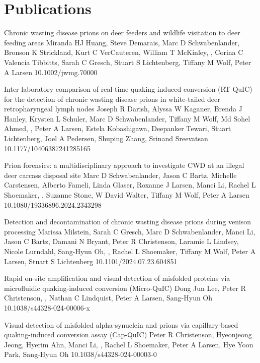 \documentclass{resume}
\begin{document}
    \section{Publications}
        \begin{samepage}
            {Chronic wasting disease prions on deer feeders and wildlife visitation to deer feeding areas}
            {Miranda HJ Huang, Steve Demarais, Marc D Schwabenlander, Bronson K Strickland, Kurt C VerCauteren, William T McKinley, \me{}, Corina C Valencia Tibbitts, Sarah C Gresch, Stuart S Lichtenberg, Tiffany M Wolf, Peter A Larsen}
            {10.1002/jwmg.70000}

            {Inter-laboratory comparison of real-time quaking-induced conversion (RT-QuIC) for the detection of chronic wasting disease prions in white-tailed deer retropharyngeal lymph nodes}
            {Joseph R Darish, Alyssa W Kaganer, Brenda J Hanley, Krysten L Schuler, Marc D Schwabenlander, Tiffany M Wolf, Md Sohel Ahmed, \me{}, Peter A Larsen, Estela Kobashigawa, Deepanker Tewari, Stuart Lichtenberg, Joel A Pedersen, Shuping Zhang, Srinand Sreevatsan}
            {10.1177/10406387241285165}

            {Prion forensics: a multidisciplinary approach to investigate CWD at an illegal deer carcass disposal site}
            {Marc D Schwabenlander, Jason C Bartz, Michelle Carstensen, Alberto Fameli, Linda Glaser, Roxanne J Larsen, Manci Li, Rachel L Shoemaker, \me{}, Suzanne Stone, W David Walter, Tiffany M Wolf, Peter A Larsen}
            {10.1080/19336896.2024.2343298}

            {Detection and decontamination of chronic wasting disease prions during venison processing}
            {Marissa Milstein, Sarah C Gresch, Marc D Schwabenlander, Manci Li, Jason C Bartz, Damani N Bryant, Peter R Christenson, Laramie L Lindsey, Nicole Lurndahl, Sang-Hyun Oh, \me{}, Rachel L Shoemaker, Tiffany M Wolf, Peter A Larsen, Stuart S Lichtenberg}
            {10.1101/2024.07.23.604851}

            {Rapid on-site amplification and visual detection of misfolded proteins via microfluidic quaking-induced conversion (Micro-QuIC)}
            {Dong Jun Lee, Peter R Christenson, \me{}, Nathan C Lindquist, Peter A Larsen, Sang-Hyun Oh}
            {10.1038/s44328-024-00006-x}

            {Visual detection of misfolded alpha-synuclein and prions via capillary-based quaking-induced conversion assay (Cap-QuIC)}
            {Peter R Christenson, Hyeonjeong Jeong, Hyerim Ahn, Manci Li, \me{}, Rachel L Shoemaker, Peter A Larsen, Hye Yoon Park, Sang-Hyun Oh}
            {10.1038/s44328-024-00003-0}


\end{samepage}
\end{document}
